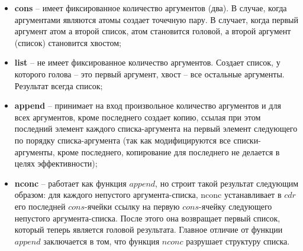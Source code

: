 \documentclass[a4paper,14pt, unknownkeysallowed]{extreport}
\begin{document}
\begin{itemize}
	\item \textbf{cons} -- имеет фиксированное количество аргументов (два). В случае, когда аргументами являются атомы создает точечную пару. В случает, когда первый аргумент атом а второй список, атом становится головой, а второй аргумент (список) становится хвостом;
	\item \textbf{list} -- не имеет фиксированное количество аргументов. Создает список, у которого голова -- это первый аргумент, хвост -- все остальные аргументы. Результат всегда список;
	\item \textbf{append} -- принимает на вход произвольное количество аргументов и для всех аргументов, кроме последнего создает копию, ссылая при этом последний элемент каждого списка-аргумента на первый элемент следующего по порядку списка-аргумента (так как модифицируются все списки-аргументы, кроме последнего, копирование для последнего не делается в целях эффективности);
	\item \textbf{nconc} -- работает как функция $append$, но строит такой результат следующим образом: для каждого непустого аргумента-списка, nconc устанавливает в $cdr$ его последней $cons$-ячейки ссылку на первую $cons$-ячейку следующего непустого аргумента-списка. После этого она возвращает первый список, который теперь является головой результата. Главное отличие от функции $append$ заключается в том, что функция $nconc$ разрушает структуру списка.
\end{itemize}
\end{document}
